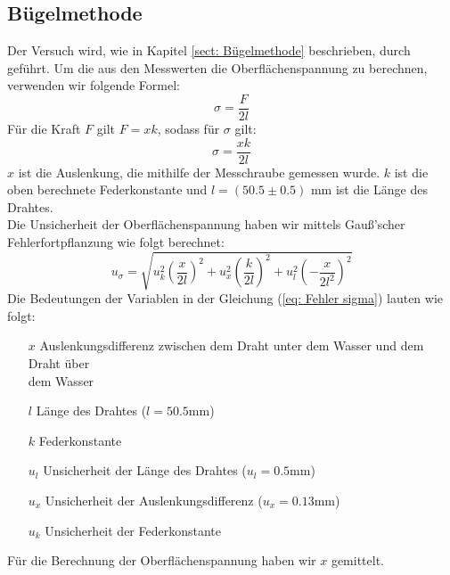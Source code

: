 \documentclass[bibliography=totocnumbered]{scrartcl}
\begin{document}
    
		
		
		
	\subsection{Bügelmethode}
Der Versuch wird, wie in Kapitel \ref{sect: Bügelmethode} beschrieben, durch geführt. Um die aus den Messwerten die Oberflächenspannung zu berechnen, verwenden wir folgende Formel:
\begin{equation}\label{eq: Oberflächenspannung 1}
	\sigma=\dfrac{F}{2l}
\end{equation}
Für die Kraft $ F $ gilt $ F=x k $, sodass für $\sigma$ gilt:
\begin{equation}\label{eq: Oberflächenspannung 2}
	\sigma=\dfrac{xk}{2l}
\end{equation}
$ x $ ist die Auslenkung,%
die mithilfe der Messchraube gemessen wurde. $ k $ ist die oben berechnete Federkonstante und $ l = (50.5\pm 0.5)$ mm%
ist die Länge des Drahtes.\\
Die Unsicherheit der Oberflächenspannung haben wir mittels Gauß'scher Fehlerfortpflanzung wie folgt berechnet:
\begin{equation}\label{eq: Fehler sigma}
	u_{\sigma}=\sqrt{u_{k}^{2}\left(\dfrac{x}{2l}\right)^{2}+u_{x}^{2}\left(\dfrac{k}{2l}\right)^{2}+u_{l}^{2}\left(-\dfrac{x}{2l^{2}}\right)^{2}}
\end{equation}
\newpage
Die Bedeutungen der Variablen in der Gleichung (\ref{eq: Fehler sigma}) lauten wie folgt:

\begin{itemize}
	\item[$ x $] Auslenkungsdifferenz zwischen dem Draht unter dem Wasser und dem Draht über \\dem Wasser
	\item[$ l $] Länge des Drahtes ($ l=50.5 $mm)
	\item[$ k $] Federkonstante
	\item[$ u_{l} $] Unsicherheit der Länge des Drahtes ($ u_{l}=0.5 $mm)
	\item[$ u_{x} $] Unsicherheit der Auslenkungsdifferenz ($ u_{x}=0.13 $mm)
	\item[$ u_{k} $] Unsicherheit der Federkonstante
\end{itemize}



Für die Berechnung der Oberflächenspannung haben wir $ x $ gemittelt.
\end{document}
